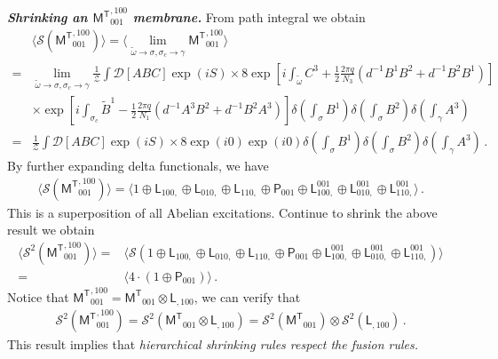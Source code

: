 \documentclass[11pt,nofootinbib,preprint]{revtex4-1}
\begin{document}
\textbf{\textit{Shrinking an $\mathsf{M^T}_{001}^{,100}$ membrane.}}
From path integral we obtain
\begin{align}
	&\langle \mathcal{S} \left( {\mathsf{M}^{\mathsf{T}}}_{001}^{,100} \right) \rangle =\langle \underset{\tilde{\omega}\rightarrow \sigma ,\sigma _c\rightarrow \gamma}{\lim}{\mathsf{M}^{\mathsf{T}}}_{001}^{,100}\rangle \nonumber
	\\
	=&\underset{\tilde{\omega}\rightarrow \sigma ,\sigma _c\rightarrow \gamma}{\lim}\frac{1}{\mathcal{Z}}\int{\mathcal{D} \left[ ABC \right] \exp \left( iS \right)}\times 8\exp \left[ i\int_{\tilde{\omega}}{C^3+\frac{1}{2}\frac{2\pi q}{N_3}\left( d^{-1}B^1B^2+d^{-1}B^2B^1 \right)} \right] \nonumber
	\\
	&\times \exp \left[ i\int_{\sigma _c}{\tilde{B}^1-\frac{1}{2}\frac{2\pi q}{N_1}\left( d^{-1}A^3B^2+d^{-1}B^2A^3 \right)} \right] \delta \left( \int_{\sigma}{B^1} \right) \delta \left( \int_{\sigma}{B^2} \right) \delta \left( \int_{\gamma}{A^3} \right) \nonumber
	\\
	=&\frac{1}{\mathcal{Z}}\int{\mathcal{D} \left[ ABC \right] \exp \left( iS \right)}\times 8\exp \left( i0 \right) \exp \left( i0 \right)  \delta \left( \int_{\sigma}{B^1} \right) \delta \left( \int_{\sigma}{B^2} \right) \delta \left( \int_{\gamma}{A^3} \right) \,.
\end{align}
By further expanding delta functionals, we have
\begin{align}
	\langle \mathcal{S} \left( {\mathsf{M}^{\mathsf{T}}}_{001}^{,100} \right) \rangle =\langle 1\oplus \mathsf{L}_{100,}\oplus \mathsf{L}_{010,}\oplus \mathsf{L}_{110,}\oplus \mathsf{P}_{001}\oplus \mathsf{L}_{100,}^{001}\oplus \mathsf{L}_{010,}^{001}\oplus \mathsf{L}_{110,}^{001}\rangle \,.
\end{align}
This is a superposition of all Abelian excitations. Continue to shrink the above result we obtain
\begin{align}
	\langle \mathcal{S} ^2\left( {\mathsf{M}^{\mathsf{T}}}_{001}^{,100} \right) \rangle =&\langle \mathcal{S} \left( 1\oplus \mathsf{L}_{100,}\oplus \mathsf{L}_{010,}\oplus \mathsf{L}_{110,}\oplus \mathsf{P}_{001}\oplus \mathsf{L}_{100,}^{001}\oplus \mathsf{L}_{010,}^{001}\oplus \mathsf{L}_{110,}^{001} \right) \rangle \nonumber
	\\
	=&\langle 4\cdot \left( 1\oplus \mathsf{P}_{001} \right) \rangle \,.
\end{align}
Notice that ${\mathsf{M}^{\mathsf{T}}}_{001}^{,100}={\mathsf{M}^{\mathsf{T}}}_{001}\otimes \mathsf{L}_{,100}$, we can verify that 
\begin{align}
	\mathcal{S} ^2\left( {\mathsf{M}^{\mathsf{T}}}_{001}^{,100} \right) =\mathcal{S} ^2\left( {\mathsf{M}^{\mathsf{T}}}_{001}\otimes \mathsf{L}_{,100} \right) =\mathcal{S} ^2\left( {\mathsf{M}^{\mathsf{T}}}_{001} \right) \otimes \mathcal{S} ^2\left( \mathsf{L}_{,100} \right) \,.
\end{align}
This result implies that \textit{hierarchical shrinking rules respect the fusion rules.}
\end{document}
